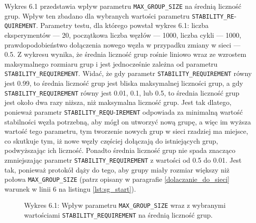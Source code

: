 \documentclass[12pt, twoside, openany]{report}
\begin{document}
Wykres 6.1 przedstawia wpływ parametru \texttt{MAX\_GROUP\_SIZE} na średnią liczność grup. Wpływ ten zbadano dla wybranych wartości parametru \texttt{STABILITY\_RE}-\texttt{QUIREMENT}. Parametry testu, dla którego powstał wykres 6.1: liczba eksperymentów --- 20, początkowa liczba węzłów --- 1000, liczba cykli --- 1000, prawdopodobieństwo dołączenia nowego węzła w przypadku zmiany w sieci --- 0.5. Z wykresu wynika, że średnia liczność grup rośnie liniowo wraz ze wzrostem maksymalnego rozmiaru grup i jest jednocześnie zależna od parametru \texttt{STABILITY\_REQUIREMENT}. Widać, że gdy parametr \texttt{STABILITY\_REQUIREMENT} równy jest 0.99, to średnia liczność grup jest bliska maksymalnej liczności grup, a gdy \texttt{STABILITY\_REQUIREMENT} równy jest 0.01, 0.1, lub 0.5, to średnia liczność grup jest około dwa razy niższa, niż maksymalna liczność grup. Jest tak dlatego, ponieważ parametr \texttt{STABILITY\_REQU}-\texttt{IREMENT} odpowiada za minimalną wartość stabilności węzła potrzebną, aby mógł on utworzyć nową grupę, a więc im wyższa wartość tego parametru, tym tworzenie nowych grup w sieci rzadziej ma miejsce, co skutkuje tym, iż nowe węzły częściej dołączają do istniejących grup, podwyższając ich liczność. Ponadto średnia liczność grup nie spada znacząco zmniejszając parametr \texttt{STABILITY\_REQUIREMENT} z wartości od 0.5 do 0.01. Jest tak, ponieważ protokół dąży do tego, aby grupy miały rozmiar większy niż połowa \texttt{MAX\_GROUP\_SIZE} (patrz opisany w paragrafie \ref{dolaczanie_do_sieci} warunek w linii 6 na listingu \ref{lst:sg_start}).

\begin{figure}[H]
\captionsetup{labelformat=empty}
\caption{Wykres 6.1: Wpływ parametru \texttt{MAX\_GROUP\_SIZE} wraz z wybranymi wartościami \texttt{STABILITY\_REQUIREMENT} na średnią liczność grup.}
\end{figure}
\end{document}
